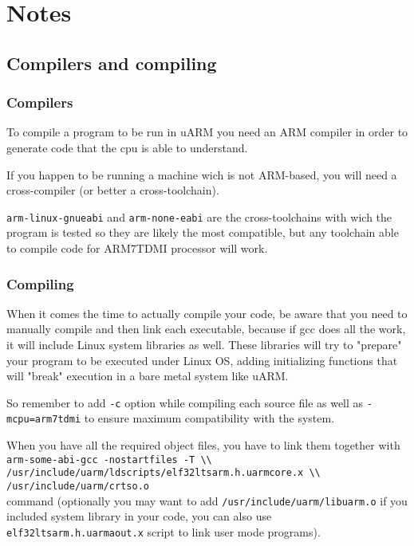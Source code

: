 \chapter{Notes}

\section{Compilers and compiling}

\subsection{Compilers}

To compile a program to be run in uARM you need an ARM compiler in order to generate code that the cpu is able to understand.

If you happen to be running a machine wich is not ARM-based, you will need a cross-compiler (or better a cross-toolchain).

\texttt{arm-linux-gnueabi} and \texttt{arm-none-eabi} are the cross-toolchains with wich the program is tested so they are likely the most compatible, but any toolchain able to compile code for ARM7TDMI processor will work.

\subsection{Compiling}

When it comes the time to actually compile your code, be aware that you need to manually compile and then link each executable, because if gcc does all the work, it will include Linux system libraries as well. These libraries will try to "prepare" your program to be executed under Linux OS, adding initializing functions that will "break" execution in a bare metal system like uARM.

So remember to add \texttt{-c} option while compiling each source file as well as \texttt{-mcpu=arm7tdmi} to ensure maximum compatibility with the system.

When you have all the required object files, you have to link them together with \\ \texttt{arm-some-abi-gcc -nostartfiles -T \textbackslash\textbackslash \\ /usr/include/uarm/ldscripts/elf32ltsarm.h.uarmcore.x \textbackslash\textbackslash \\ /usr/include/uarm/crtso.o}\\ command (optionally you may want to add \texttt{/usr/include/uarm/libuarm.o} if you included system library in your code, you can also use \texttt{elf32ltsarm.h.uarmaout.x} script to link user mode programs).

